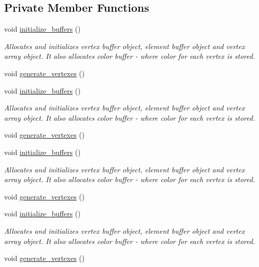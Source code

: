 \subsection*{Private Member Functions}
\begin{DoxyCompactItemize}
\item 
void \mbox{\hyperlink{classSpinArray_a3a7064b0c74a8a777d8a987f29c31108}{initialize\+\_\+buffers}} ()
\begin{DoxyCompactList}\small\item\em Allocates and initializes vertex buffer object, element buffer object and vertex array object. It also allocates color buffer -\/ where color for each vertex is stored. \end{DoxyCompactList}\item 
void \mbox{\hyperlink{classSpinArray_a9a91cd3d27cfd626edaaafe1cf2bc679}{generate\+\_\+vertexes}} ()
\item 
void \mbox{\hyperlink{classSpinArray_a3a7064b0c74a8a777d8a987f29c31108}{initialize\+\_\+buffers}} ()
\begin{DoxyCompactList}\small\item\em Allocates and initializes vertex buffer object, element buffer object and vertex array object. It also allocates color buffer -\/ where color for each vertex is stored. \end{DoxyCompactList}\item 
void \mbox{\hyperlink{classSpinArray_a9a91cd3d27cfd626edaaafe1cf2bc679}{generate\+\_\+vertexes}} ()
\item 
void \mbox{\hyperlink{classSpinArray_a3a7064b0c74a8a777d8a987f29c31108}{initialize\+\_\+buffers}} ()
\begin{DoxyCompactList}\small\item\em Allocates and initializes vertex buffer object, element buffer object and vertex array object. It also allocates color buffer -\/ where color for each vertex is stored. \end{DoxyCompactList}\item 
void \mbox{\hyperlink{classSpinArray_a9a91cd3d27cfd626edaaafe1cf2bc679}{generate\+\_\+vertexes}} ()
\item 
void \mbox{\hyperlink{classSpinArray_a3a7064b0c74a8a777d8a987f29c31108}{initialize\+\_\+buffers}} ()
\begin{DoxyCompactList}\small\item\em Allocates and initializes vertex buffer object, element buffer object and vertex array object. It also allocates color buffer -\/ where color for each vertex is stored. \end{DoxyCompactList}\item 
void \mbox{\hyperlink{classSpinArray_a9a91cd3d27cfd626edaaafe1cf2bc679}{generate\+\_\+vertexes}} ()
\end{DoxyCompactItemize}

